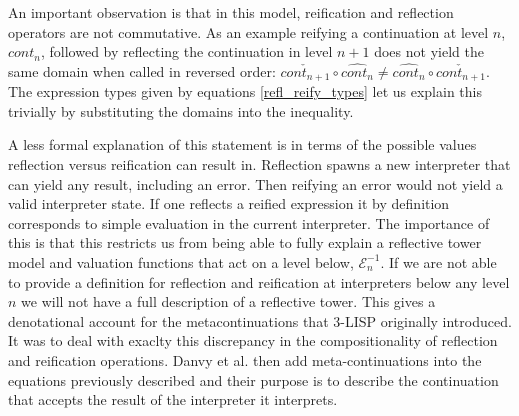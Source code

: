 \documentclass{article}
\theoremstyle{definition}
\begin{document}
An important observation is that in this model, reification and reflection operators are not commutative. As an example reifying a continuation at level $n$, $cont_n$, followed by reflecting the continuation in level $n+1$ does not yield the same domain when called in reversed order: $\check{cont_{n+1}} \circ \hat{cont_n} \neq \hat{cont_n} \circ \check{cont_{n+1}}$. The expression types given by equations \ref{refl_reify_types} let us explain this trivially by substituting the domains into the inequality.

%
%

A less formal explanation of this statement is in terms of the possible values reflection versus reification can result in. Reflection spawns a new interpreter that can yield any result, including an error. Then reifying an error would not yield a valid interpreter state. If one reflects a reified expression it by definition corresponds to simple evaluation in the current interpreter. The importance of this is that this restricts us from being able to fully explain a reflective tower model and valuation functions that act on a level below, $\mathcal{E}^{-1}_n$. If we are not able to provide a definition for reflection and reification at interpreters below any level $n$ we will not have a full description of a reflective tower. This gives a denotational account for the metacontinuations that 3-LISP originally introduced. It was to deal with exaclty this discrepancy in the compositionality of reflection and reification operations. Danvy et al. then add meta-continuations into the equations previously described and their purpose is to describe the continuation that accepts the result of the interpreter it interprets.
\end{document}
